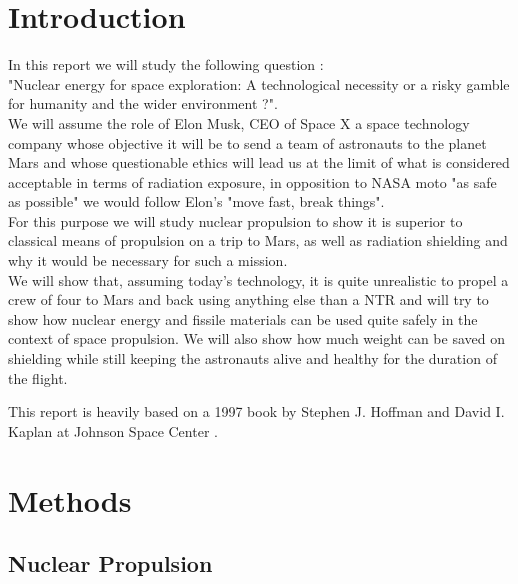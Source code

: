 \documentclass[12pt,a4paper]{report}
\author{S. Bourgeois}
\begin{document}




\tableofcontents

\chapter*{Introduction}

\quad In this report we will study the following question : \\
"Nuclear energy for space exploration: A technological necessity or a risky gamble for humanity and the wider environment ?".\\

We will assume the role of Elon Musk, CEO of Space X a space technology company whose objective it will be to send a team of astronauts to the planet Mars and whose questionable ethics will lead us at the limit of what is considered acceptable in terms of radiation exposure, in opposition to NASA moto "as safe as possible" we would follow Elon's "move fast, break things".\\
For this purpose we will study nuclear propulsion to show it is superior to classical means of propulsion on a trip to Mars, as well as radiation shielding and why it would be necessary for such a mission.\\

We will show that, assuming today's technology, it is quite unrealistic to propel a crew of four to Mars and back using anything else than a NTR and will try to show how nuclear energy and fissile materials can be used quite safely in the context of space propulsion. We will also show how much weight can be saved on shielding while still keeping the astronauts alive and healthy for the duration of the flight.

This report is heavily based on a 1997 book by Stephen J. Hoffman and David I. Kaplan at Johnson Space Center \cite{Hoffman1997}.


\chapter{Methods}

\section{Nuclear Propulsion}
\end{document}
